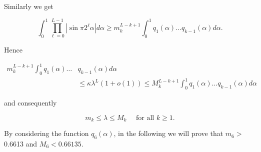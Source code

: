 \documentclass[10pt]{article}
\newcommand{\1}{\mathbf{1}}
\begin{document}
Similarly we get

$$
\int_{0}^{1} \prod_{\ell=0}^{L-1}\left|\sin \pi 2^{\ell} \alpha\right| d \alpha \geqslant m_k^{L-k+1} \int_{0}^{1} q_{1}(\alpha) \ldots q_{k-1}(\alpha) d \alpha .
$$

Hence

$$
\begin{aligned}
m_k^{L-k+1} \int_{0}^{1} q_{1}(\alpha) \ldots & q_{k-1}(\alpha) d \alpha \\
& \leqslant \kappa \lambda^{L}(1+o(1)) \leqslant M_k^{L-k+1} \int_{0}^{1} q_{1}(\alpha) \ldots q_{k-1}(\alpha) d \alpha
\end{aligned}
$$

and consequently


\begin{equation*}
m_{k} \leqslant \lambda \leqslant M_{k} \quad \text { for all } k \geqslant 1 . \tag{5.3}
\end{equation*}


By considering the function $q_{6}(\alpha)$, in the following we will prove that $m_{6}>$ 0.6613 and $M_{6}<0.66135$.
\end{document}
